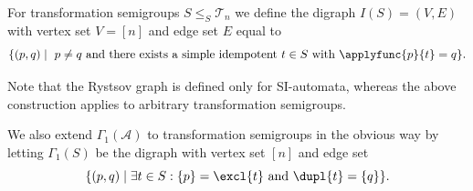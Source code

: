 
For transformation semigroups $S \le_S \mathcal T_n$
we define the digraph \label{def:graph_IS}
$
I(S) = (V, E)
$
with vertex set $V = [n]$ and edge set $E$ equal to
\[
	\{ (p,q) \mid  \text{ $p \ne q$ and there exists a simple idempotent $t \in S$ with $\applyfunc{p}{t} = q$} \}.
\] 

Note that the Rystsov graph is defined only for SI-automata, whereas the above construction applies to arbitrary transformation semigroups. 

\label{def:GammaS}
We also extend $\Gamma_1(\mathcal A)$ to transformation semigroups in the obvious way
by letting $\Gamma_1(S)$ be the digraph
with vertex set $[n]$ and edge set
\[ 
\{ (p, q) \mid \exists t \in S : \{p\} = \excl{t} \text{ and }  \dupl{t} = \{q\} \}.
\]